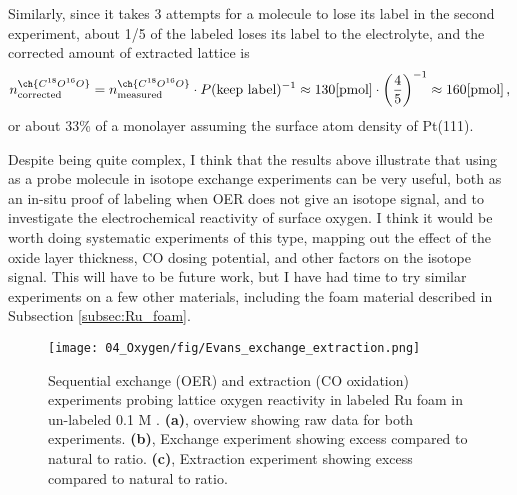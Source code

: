 Similarly, since it takes 3 attempts for a  molecule to lose its label in the second experiment, about 1/5 of the labeled  loses its label to the electrolyte, and the corrected amount of extracted lattice  is
\begin{equation}
n^{\ch{C^{18}O^{16}O}}_\text{corrected} = n^{\ch{C^{18}O^{16}O}}_{\text{measured}} \cdot P(\text{keep label})^{-1} \approx 130 \text{[pmol]} \cdot \left(\frac{4}{5}\right)^{-1} \approx 160 \text{[pmol]}\,,
\end{equation}
or about 33\% of a monolayer assuming the surface atom density of Pt(111).

Despite being quite complex, I think that the results above illustrate that using  as a probe molecule in isotope exchange experiments can be very useful, both as an in-situ proof of labeling when OER does not give an isotope signal, and to investigate the electrochemical reactivity of surface oxygen. I think it would be worth doing systematic experiments of this type, mapping out the effect of the oxide layer thickness, CO dosing potential, and other factors on the isotope signal. This will have to be future work, but I have had time to try similar experiments on a few other materials, including the  foam material described in Subsection \ref{subsec:Ru_foam}.

\begin{figure}[t]
	\centering
	\texttt{[image: 04\_Oxygen/fig/Evans\_exchange\_extraction.png]}
	\caption{Sequential exchange (OER) and extraction (CO oxidation) experiments probing lattice oxygen reactivity in labeled Ru foam in un-labeled 0.1 M .  \textbf{(a)}, overview showing raw data for both experiments. \textbf{(b)}, Exchange experiment showing excess  compared to natural  to  ratio. \textbf{(c)}, Extraction experiment showing excess  compared to natural  to  ratio.
	}
	\label{fig:Evans_extraction}
\end{figure}

